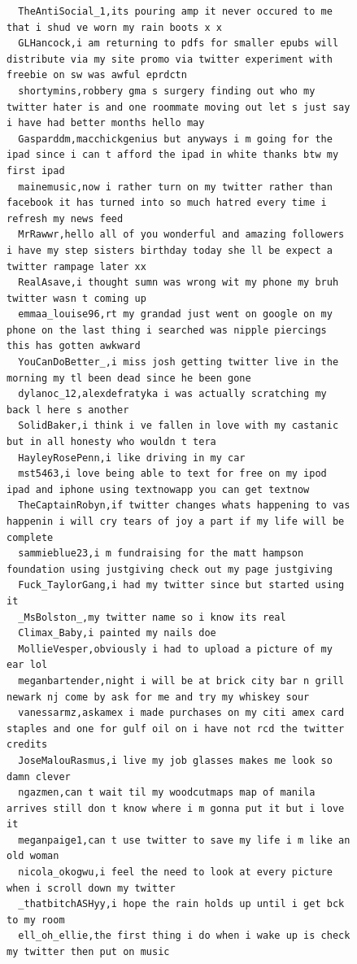 \begin{figure}[htpb]
\begin{verbatim}
  TheAntiSocial_1,its pouring amp it never occured to me that i shud ve worn my rain boots x x
  GLHancock,i am returning to pdfs for smaller epubs will distribute via my site promo via twitter experiment with freebie on sw was awful eprdctn
  shortymins,robbery gma s surgery finding out who my twitter hater is and one roommate moving out let s just say i have had better months hello may
  Gasparddm,macchickgenius but anyways i m going for the ipad since i can t afford the ipad in white thanks btw my first ipad
  mainemusic,now i rather turn on my twitter rather than facebook it has turned into so much hatred every time i refresh my news feed
  MrRawwr,hello all of you wonderful and amazing followers i have my step sisters birthday today she ll be expect a twitter rampage later xx
  RealAsave,i thought sumn was wrong wit my phone my bruh twitter wasn t coming up
  emmaa_louise96,rt my grandad just went on google on my phone on the last thing i searched was nipple piercings this has gotten awkward
  YouCanDoBetter_,i miss josh getting twitter live in the morning my tl been dead since he been gone
  dylanoc_12,alexdefratyka i was actually scratching my back l here s another
  SolidBaker,i think i ve fallen in love with my castanic but in all honesty who wouldn t tera
  HayleyRosePenn,i like driving in my car
  mst5463,i love being able to text for free on my ipod ipad and iphone using textnowapp you can get textnow
  TheCaptainRobyn,if twitter changes whats happening to vas happenin i will cry tears of joy a part if my life will be complete
  sammieblue23,i m fundraising for the matt hampson foundation using justgiving check out my page justgiving
  Fuck_TaylorGang,i had my twitter since but started using it
  _MsBolston_,my twitter name so i know its real
  Climax_Baby,i painted my nails doe
  MollieVesper,obviously i had to upload a picture of my ear lol
  meganbartender,night i will be at brick city bar n grill newark nj come by ask for me and try my whiskey sour
  vanessarmz,askamex i made purchases on my citi amex card staples and one for gulf oil on i have not rcd the twitter credits
  JoseMalouRasmus,i live my job glasses makes me look so damn clever
  ngazmen,can t wait til my woodcutmaps map of manila arrives still don t know where i m gonna put it but i love it
  meganpaige1,can t use twitter to save my life i m like an old woman
  nicola_okogwu,i feel the need to look at every picture when i scroll down my twitter
  _thatbitchASHyy,i hope the rain holds up until i get bck to my room
  ell_oh_ellie,the first thing i do when i wake up is check my twitter then put on music

\end{verbatim}
\end{figure}

